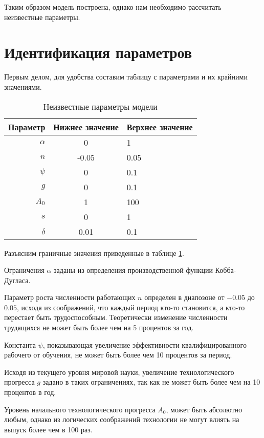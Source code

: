 Таким образом модель построена, однако нам необходимо рассчитать неизвестные параметры.

\section{Идентификация параметров}

Первым делом, для удобства составим таблицу с параметрами и их крайними значениями.
\begin{table}[ht]
	\centering
	\caption{Неизвестные параметры модели}
	\label{tab:parameters}
	\begin{tabular}{|r|c|l|}
	\hline
	Параметр & Нижнее значение & Верхнее значение \\ \hline
	$\alpha$ &      0          &      1           \\
	$n$      &      -0.05      &      0.05        \\
	$\psi$   &      0          &      0.1         \\
	$g$      &      0          &      0.1         \\
	$A_0$    &      1          &      100         \\
	$s$      &      0          &      1           \\
	$\delta$ &      0.01       &    0.1           \\ \hline
	\end{tabular}%
\end{table}
Разъясним граничные значения приведенные в таблице \ref{tab:parameters}.

Ограничения $\alpha$ заданы из определения производственной функции Кобба-Дугласа.

Параметр роста численности работающих $n$ определен в диапозоне от $-0.05$ до $0.05$, исходя из соображений, что каждый период кто-то становится, а кто-то перестает быть трудоспособным.
Теоретически изменение численности трудящихся не может быть более чем на 5 процентов за год.

Константа $\psi$, показывающая увеличение эффективности квалифицированного рабочего от обучения, не может быть более чем 10 процентов за период.

Исходя из текущего уровня мировой науки, увеличение технологического прогресса $g$ задано в таких ограничениях, так как не может быть более чем на 10 процентов в год.

Уровень начального технологического прогресса $A_0$, может быть абсолютно любым, однако из логических соображений технологии не могут влиять на выпуск более чем в 100 раз.

